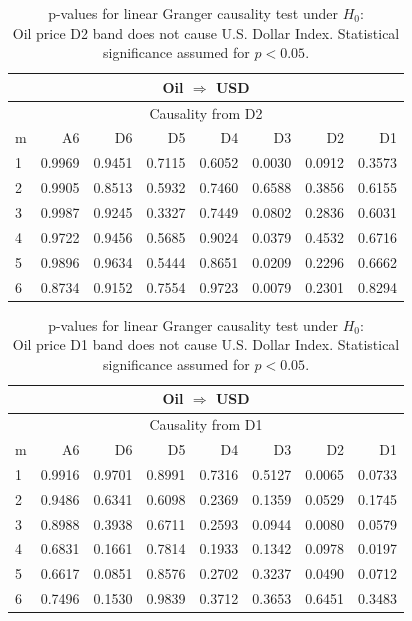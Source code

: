 %
%
\begin{table}[H]
\begin{center}
\begin{tabular}{l|r r r r r r r}
\hline\hline
\multicolumn{8}{c}{Oil $\Rightarrow$ USD}\\
\hline
\multicolumn{8}{c}{Causality from D2}\\
\hline\hline
m & A6 & D6 & D5 & D4 & D3 & D2 & D1 \\
\hline
1 & 0.9969 & 0.9451 & 0.7115 & 0.6052 & \cellcolor{mygreen}0.0030 & 0.0912 & 0.3573 \\
2 & 0.9905 & 0.8513 & 0.5932 & 0.7460 & 0.6588 & 0.3856 & 0.6155 \\
3 & 0.9987 & 0.9245 & 0.3327 & 0.7449 & 0.0802 & 0.2836 & 0.6031 \\
4 & 0.9722 & 0.9456 & 0.5685 & 0.9024 & \cellcolor{mygreen}0.0379 & 0.4532 & 0.6716 \\
5 & 0.9896 & 0.9634 & 0.5444 & 0.8651 & \cellcolor{mygreen}0.0209 & 0.2296 & 0.6662 \\
6 & 0.8734 & 0.9152 & 0.7554 & 0.9723 & \cellcolor{mygreen}0.0079 & 0.2301 & 0.8294 \\
\hline\hline
\end{tabular}
\caption{p-values for linear Granger causality test under $H_0$:\\
Oil price D2 band does not cause U.S. Dollar Index. Statistical significance assumed for $p<0.05$.}
\end{center}
\end{table}

%
%
\begin{table}[H]
\begin{center}
\begin{tabular}{l|r r r r r r r}
\hline\hline
\multicolumn{8}{c}{Oil $\Rightarrow$ USD}\\
\hline
\multicolumn{8}{c}{Causality from D1}\\
\hline\hline
m & A6 & D6 & D5 & D4 & D3 & D2 & D1 \\
\hline
1 & 0.9916 & 0.9701 & 0.8991 & 0.7316 & 0.5127 & \cellcolor{mygreen}0.0065 & 0.0733 \\
2 & 0.9486 & 0.6341 & 0.6098 & 0.2369 & 0.1359 & 0.0529 & 0.1745 \\
3 & 0.8988 & 0.3938 & 0.6711 & 0.2593 & 0.0944 & \cellcolor{mygreen}0.0080 & 0.0579 \\
4 & 0.6831 & 0.1661 & 0.7814 & 0.1933 & 0.1342 & 0.0978 & \cellcolor{mygreen}0.0197 \\
5 & 0.6617 & 0.0851 & 0.8576 & 0.2702 & 0.3237 & \cellcolor{mygreen}0.0490 & 0.0712 \\
6 & 0.7496 & 0.1530 & 0.9839 & 0.3712 & 0.3653 & 0.6451 & 0.3483 \\
\hline\hline
\end{tabular}
\caption{p-values for linear Granger causality test under $H_0$:\\
Oil price D1 band does not cause U.S. Dollar Index. Statistical significance assumed for $p<0.05$.}
\end{center}
\end{table}

